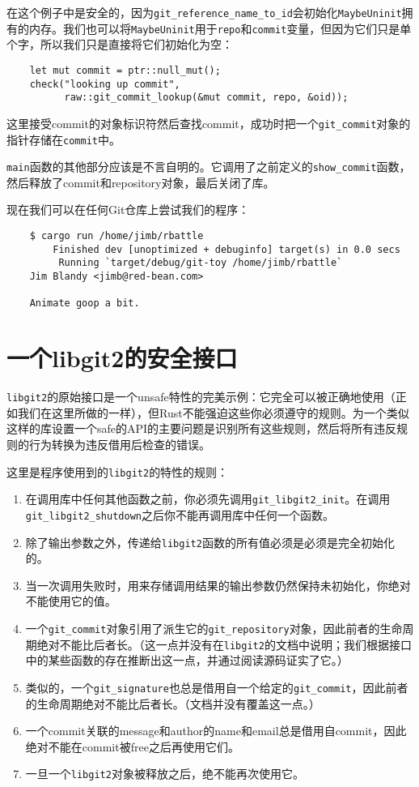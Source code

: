 在这个例子中是安全的，因为\texttt{git\_reference\_name\_to\_id}会初始化\texttt{MaybeUninit}拥有的内存。我们也可以将\texttt{MaybeUninit}用于\texttt{repo}和\texttt{commit}变量，但因为它们只是单个字，所以我们只是直接将它们初始化为空：
\begin{verbatim}
    let mut commit = ptr::null_mut();
    check("looking up commit",
          raw::git_commit_lookup(&mut commit, repo, &oid));
\end{verbatim}

这里接受commit的对象标识符然后查找commit，成功时把一个\texttt{git\_commit}对象的指针存储在\texttt{commit}中。

\texttt{main}函数的其他部分应该是不言自明的。它调用了之前定义的\texttt{show\_commit}函数，然后释放了commit和repository对象，最后关闭了库。

现在我们可以在任何Git仓库上尝试我们的程序：
\begin{verbatim}
    $ cargo run /home/jimb/rbattle
        Finished dev [unoptimized + debuginfo] target(s) in 0.0 secs
         Running `target/debug/git-toy /home/jimb/rbattle`
    Jim Blandy <jimb@red-bean.com>

    Animate goop a bit.
\end{verbatim}

\section{一个libgit2的安全接口}\label{SafeInter}
\texttt{libgit2}的原始接口是一个unsafe特性的完美示例：它完全可以被正确地使用（正如我们在这里所做的一样），但Rust不能强迫这些你必须遵守的规则。为一个类似这样的库设置一个safe的API的主要问题是识别所有这些规则，然后将所有违反规则的行为转换为违反借用后检查的错误。

这里是程序使用到的\texttt{libgit2}的特性的规则：
\begin{enumerate}
    \item 在调用库中任何其他函数之前，你必须先调用\texttt{git\_libgit2\_init}。在调用\\
    \texttt{git\_libgit2\_shutdown}之后你不能再调用库中任何一个函数。
    \item 除了输出参数之外，传递给\texttt{libgit2}函数的所有值必须是必须是完全初始化的。
    \item 当一次调用失败时，用来存储调用结果的输出参数仍然保持未初始化，你绝对不能使用它的值。
    \item 一个\texttt{git\_commit}对象引用了派生它的\texttt{git\_repository}对象，因此前者的生命周期绝对不能比后者长。（这一点并没有在\texttt{libgit2}的文档中说明；我们根据接口中的某些函数的存在推断出这一点，并通过阅读源码证实了它。）
    \item 类似的，一个\texttt{git\_signature}也总是借用自一个给定的\texttt{git\_commit}，因此前者的生命周期绝对不能比后者长。（文档并没有覆盖这一点。）
    \item 一个commit关联的message和author的name和email总是借用自commit，因此绝对不能在commit被free之后再使用它们。
    \item 一旦一个\texttt{libgit2}对象被释放之后，绝不能再次使用它。
\end{enumerate}


